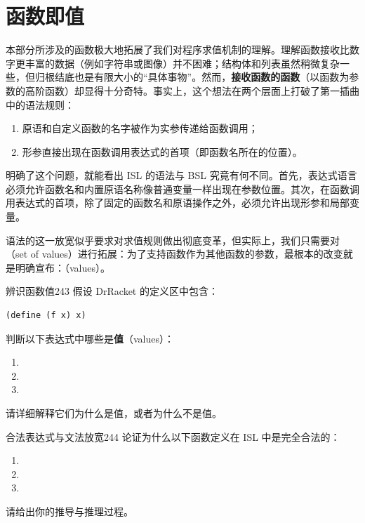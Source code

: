\section{函数即值}
\label{sec:14_4}

本部分所涉及的函数极大地拓展了我们对程序求值机制的理解。理解函数接收比数字更丰富的数据（例如字符串或图像）并不困难；结构体和列表虽然稍微复杂一些，但归根结底也是有限大小的“具体事物”。然而，\textbf{接收函数的函数}（以函数为参数的高阶函数）却显得十分奇特。事实上，这个想法在两个层面上打破了第一插曲中的语法规则：
\begin{enumerate}
  \item 原语和自定义函数的名字被作为实参传递给函数调用；
  \item 形参直接出现在函数调用表达式的首项（即函数名所在的位置）。
\end{enumerate}

明确了这个问题，就能看出 ISL 的语法与 BSL 究竟有何不同。首先，表达式语言必须允许函数名和内置原语名称像普通变量一样出现在参数位置。其次，在函数调用表达式的首项，除了固定的函数名和原语操作之外，必须允许出现形参和局部变量。

语法的这一放宽似乎要求对求值规则做出彻底变革，但实际上，我们只需要对（set of values）进行拓展：为了支持函数作为其他函数的参数，最根本的改变就是明确宣布：（values）。

\begin{exercise}{辨识函数值}{243}
假设 DrRacket 的定义区中包含：

\begin{lstlisting}[language=BSL]
(define (f x) x)
\end{lstlisting}

判断以下表达式中哪些是\textbf{值}（values）：
\begin{enumerate}
  \item {}
  \item {}
  \item {}
\end{enumerate}
请详细解释它们为什么是值，或者为什么不是值。
\end{exercise}

\begin{exercise}{合法表达式与文法放宽}{244}
论证为什么以下函数定义在 ISL 中是完全合法的：
\begin{enumerate}
  \item {}
  \item {}
  \item {}
\end{enumerate}
请给出你的推导与推理过程。
\end{exercise}

